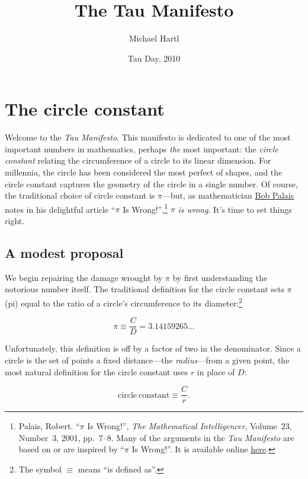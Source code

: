 \documentclass{article}
\begin{document}
\title{The Tau Manifesto}
\author{Michael Hartl}
\date{Tau Day, 2010}
\maketitle

\section{The circle constant} %
\label{sec:the_circle_constant}

Welcome to the \emph{Tau Manifesto}. This manifesto is dedicated to one of the most important numbers in mathematics, perhaps \emph{the} most important: the \emph{circle constant} relating the circumference of a circle to its linear dimension. For millennia, the circle has been considered the most perfect of shapes, and the circle constant captures the geometry of the circle in a single number. Of course, the traditional choice of circle constant is $\pi$---but, as mathematician \href{http://www.math.utah.edu/~palais/}{Bob Palais} notes in his delightful article ``$\pi$ Is Wrong!'',\footnote{Palais, Robert. ``$\pi$ Is Wrong!'', \emph{The Mathematical Intelligencer}, Volume~23, Number~3, 2001, pp.~7--8. Many of the arguments in the \emph{Tau Manifesto} are based on or are inspired by ``$\pi$ Is Wrong!''. It is available online \href{http://www.math.utah.edu/~palais/pi.html}{here}.} $\pi$ \emph{is wrong}. It's time to set things right.

  \subsection{A modest proposal} %
  \label{sec:a_modest_proposal}

We begin repairing the damage wrought by $\pi$ by first understanding the notorious number itself. The traditional definition for the circle constant sets $\pi$ (pi) equal to the ratio of a circle's circumference to its diameter:\footnote{The symbol $\equiv$ means ``is defined as''.}


\[
  \pi \equiv \frac{C}{D} = 3.14159265\ldots
\]

\noindent Unfortunately, this definition is off by a factor of two in the denominator. Since a circle is the set of points a fixed distance---the \emph{radius}---from a given point, the most natural definition for the circle constant uses $r$ in place of $D$:

\[
  \mathrm{circle\ constant} \equiv \frac{C}{r}.
\]
\end{document}
